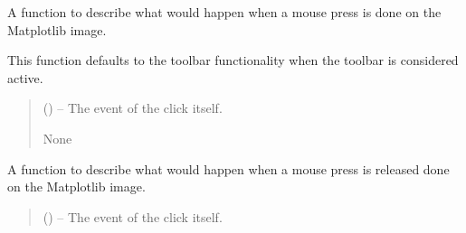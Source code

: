 \documentclass[letterpaper,11pt,english]{sphinxmanual}
\begin{document}
\begin{savenotes}
\begin{fulllineitems}

\begin{savenotes}\begin{fulllineitems}
\label{\detokenize{code/opihiexarata.gui.selector:opihiexarata.gui.selector.TargetSelectorWindow.__connect_matplotlib_mouse_press_event}}
\pysigstartsignatures
{}
\pysigstopsignatures
\sphinxAtStartPar
A function to describe what would happen when a mouse press is
done on the Matplotlib image.

\sphinxAtStartPar
This function defaults to the toolbar functionality when the toolbar
is considered active.
\begin{quote}\begin{description}
\sphinxAtStartPar
{} () – The event of the click itself.

\sphinxAtStartPar
None

\end{description}\end{quote}

\end{fulllineitems}\end{savenotes}


\begin{savenotes}\begin{fulllineitems}
\label{\detokenize{code/opihiexarata.gui.selector:opihiexarata.gui.selector.TargetSelectorWindow.__connect_matplotlib_mouse_release_event}}
\pysigstartsignatures
{}
\pysigstopsignatures
\sphinxAtStartPar
A function to describe what would happen when a mouse press is
released done on the Matplotlib image.
\begin{quote}\begin{description}
\sphinxAtStartPar
{} () – The event of the click itself.


\end{description}
\end{quote}
\end{fulllineitems}
\end{savenotes}
\end{fulllineitems}
\end{savenotes}
\end{document}
